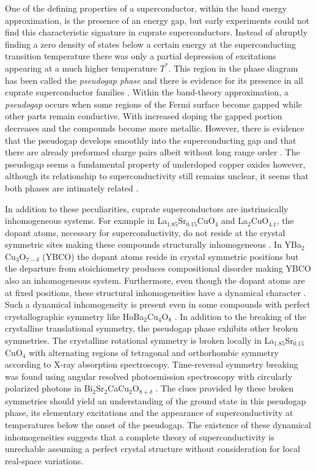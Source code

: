 One of the defining properties of a superconductor, within the band energy approximation, is the presence of an energy gap, but early experiments could not find this characteristic signature in cuprate superconductors.
Instead of abruptly finding a zero density of states below a certain energy at the superconducting transition temperature there was only a partial depression of excitations appearing at a much higher temperature $T^*$.
This region in the phase diagram has been called the \textit{pseudogap phase} and there is evidence for its presence in all cuprate superconductor families \cite{Timusk1999,Muller2007}.
Within the band-theory approximation, a \textit{pseudogap} occurs when some regions of the Fermi surface become gapped while other parts remain conductive. 
With increased doping the gapped portion decreases and the compounds become more metallic. 
However, there is evidence that the pseudogap develops smoothly into the superconducting gap and that there are already preformed charge pairs albeit without long range order \cite{Orenstein2000}. 
The pseudogap seems a fundamental property of underdoped copper oxides however, although its relationship to superconductivity still remains unclear, it seems that both phases are intimately related \cite{Basov2005}.

In addition to these peculiarities, cuprate superconductors are instrinsically inhomogeneous systems.
For example in La$_{1.85}$Sr$_{0.15}$CuO$_{4}$ and La$_{2}$CuO$_{4.1}$, the dopant atoms, necessary for superconductivity, do not reside at the crystal symmetric sites making these compounds structurally inhomogeneous \cite{Poccia2011}.
In YBa$_2$Cu$_3$O$_{7-\delta}$ (YBCO) the dopant atoms reside in crystal symmetric positions but the departure from stoichiometry produces compositional disorder \cite{Chen1988,Andersen1990} making YBCO also an inhomogeneous system.
Furthermore, even though the dopant atoms are at fixed positions, these structural inhomogeneities have a dynamical character \cite{Mihailovic2005,Bianconi1996}.
Such a dynamical inhomogeneity is present even in some compounds with perfect crystallographic symmetry like HoBa$_{2}$Cu$_{4}$O$_{8}$ \cite{RubioTemprano2000}.
In addition to the breaking of the crystalline translational symmetry, the pseudogap phase exhibits other broken symmetries. 
The crystalline rotational symmetry is broken locally in La$_{1.85}$Sr$_{0.15}$CuO$_{4}$ with alternating regions of tetragonal and orthorhombic symmetry \cite{Bianconi1996} according to X-ray absorption spectroscopy. 
Time-reversal symmetry breaking was found using angular resolved photoemission spectroscopy with circularly polarized photons in Bi$_{2}$Sr$_{2}$CaCu$_{2}$O$_{8+\delta}$ \cite{Kaminski2002}. 
The clues provided by these broken symmetries should yield an understanding of the ground state in this pseudogap phase, its elementary excitations and the appearance of superconductivity at temperatures below the onset of the pseudogap. 
The existence of these dynamical inhomogeneities suggests that a complete theory of superconductivity is unrechable assuming a perfect crystal structure without consideration for local real-space variations.


